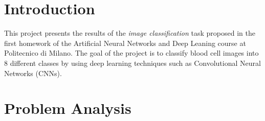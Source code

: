 \documentclass[11pt]{article}
\begin{document}
\begin{multicols}{2}

      \section{Introduction}


      This project presents the results of the \textit{image classification}
      task proposed in the first homework of the Artificial Neural Networks and
      Deep Leaning course at Politecnico di Milano. The goal of the project is
      to classify blood cell images into 8 different classes by using deep
      learning techniques such as Convolutional Neural Networks (CNNs).

      \section{Problem Analysis}


\end{multicols}
\end{document}
